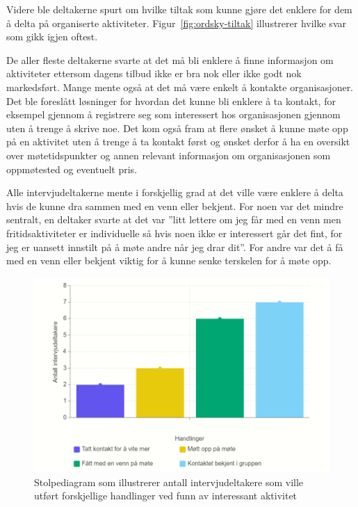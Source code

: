 Videre ble deltakerne spurt om hvilke tiltak som kunne gjøre det enklere for dem å delta på organiserte aktiviteter. Figur~\ref{fig:ordsky-tiltak} illustrerer hvilke svar som gikk igjen oftest.

De aller fleste deltakerne svarte at det må bli enklere å finne informasjon om aktiviteter ettersom dagens tilbud ikke er bra nok eller ikke godt nok markedsført. Mange mente også at det må være enkelt å kontakte organisasjoner. Det ble foreslått løsninger for hvordan det kunne bli enklere å ta kontakt, for eksempel gjennom å registrere seg som interessert hos organisasjonen gjennom uten å trenge å skrive noe. Det kom også fram at flere ønsket å kunne møte opp på en aktivitet uten å trenge å ta kontakt først og ønsket derfor å ha en oversikt over møtetidspunkter og annen relevant informasjon om organisasjonen som oppmøtested og eventuelt pris.

Alle intervjudeltakerne mente i forskjellig grad at det ville være enklere å delta hvis de kunne dra sammen med en venn eller bekjent. For noen var det mindre sentralt, en deltaker svarte at det var ''litt lettere om jeg får med en venn men fritidsaktiviteter er individuelle så hvis noen ikke er interessert går det fint, for jeg er uansett innstilt på å møte andre når jeg drar dit''. For andre var det å få med en venn eller bekjent viktig for å kunne senke terskelen for å møte opp.

\begin{figure}[H]
\includegraphics[width=\textwidth]{Illustrasjoner/diagram-handlinger.png}
\caption{Stolpediagram som illustrerer antall intervjudeltakere som ville utført forskjellige handlinger ved funn av interessant aktivitet}
\label{fig:diagram-handlinger}
\end{figure}

